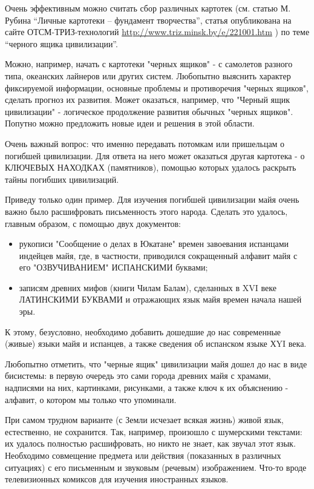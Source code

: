 \documentclass[11pt,a4paper]{article}
\begin{document}
Очень эффективным можно считать сбор различных картотек (см. статью М. Рубина
“Личные картотеки – фундамент творчества”, статья опубликована на сайте
ОТСМ-ТРИЗ-технологий  \url{http://www.triz.minsk.by/e/221001.htm} ) по теме
“черного ящика цивилизации”.

Можно, например, начать с картотеки "черных ящиков" - с самолетов разного
типа, океанских лайнеров или других систем. Любопытно выяснить характер
фиксируемой информации, основные проблемы и противоречия "черных ящиков",
сделать прогноз их развития. Может оказаться, например, что "Черный ящик
цивилизации" - логическое продолжение развития обычных "черных
ящиков". Попутно можно предложить новые идеи и решения в этой области.

Очень важный вопрос: что именно передавать потомкам или пришельцам о погибшей
цивилизации. Для ответа на него может оказаться другая картотека - о КЛЮЧЕВЫХ
НАХОДКАХ (памятников), помощью которых удалось раскрыть тайны погибших
цивилизаций.
\medskip

Приведу только один пример. Для изучения погибшей цивилизации майя очень важно было расшифровать письменность этого народа. Сделать это удалось, главным образом, с помощью двух документов:
\begin{itemize}
\item рукописи "Сообщение о делах в Юкатане" времен завоевания испанцами
  индейцев майя, где, в частности, приводился сокращенный алфавит майя с его
  "ОЗВУЧИВАНИЕМ" ИСПАНСКИМИ буквами;
\item записям древних мифов (книги Чилам Балам), сделанных в XVI веке
  ЛАТИНСКИМИ БУКВАМИ и отражающих язык майя времен начала нашей эры.
\end{itemize}
К этому, безусловно, необходимо добавить дошедшие до нас современные (живые)
языки майя и испанцев, а также сведения об испанском языке ХYI века.

Любопытно отметить, что "черные ящик" цивилизации майя дошел до нас в виде
бисистемы: в первую очередь это сами города древних майя с храмами, надписями
на них, картинками, рисунками, а также ключ к их объяснению - алфавит, о
котором мы только что упоминали.
\medskip

При самом трудном варианте (с Земли исчезает всякая жизнь) живой язык,
естественно, не сохранится. Так, например, произошло с шумерскими текстами: их
удалось полностью расшифровать, но никто не знает, как звучал этот
язык. Необходимо совмещение предмета или действия (показанных в различных
ситуациях) с его письменным и звуковым (речевым) изображением. Что-то вроде
телевизионных комиксов для изучения иностранных языков.
\end{document}
